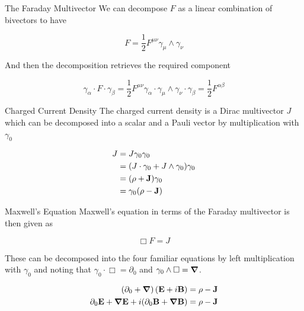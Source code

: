 \documentclass{beamer}
\begin{document}
\begin{frame}{The Faraday Multivector}
We can decompose $F$ as a linear combination of bivectors to have

\begin{equation*}
	F = \frac{1}2 F^{\mu\nu} \gamma_\mu \wedge \gamma_\nu
\end{equation*}

And then the decomposition retrieves the required component

\begin{equation*}
	\gamma_\alpha \cdot F \cdot \gamma_\beta  = \frac{1}{2} F^{\mu\nu} \gamma_\alpha \cdot \gamma_\mu \wedge \gamma_\nu \cdot \gamma_\beta = \frac{1}{2} F^{\alpha\beta}
\end{equation*}
\end{frame}

\begin{frame}{Charged Current Density}
The charged current density is a Dirac multivector $J$ which can be decomposed into a scalar and a Pauli vector by multiplication with $\gamma_0$

\begin{align*}
	J &= J\gamma_0\gamma_0 \\
	&= (J\cdot\gamma_0 + J \wedge \gamma_0) \gamma_0 \\
	&= (\rho + \vb J) \gamma_0 \\
	&= \gamma_0 (\rho - \vb J)
\end{align*}
\end{frame}

\begin{frame}{Maxwell's Equation}
Maxwell's equation in terms of the Faraday multivector is then given as

\begin{equation}
	\Box F = J
\end{equation}

These can be decomposed into the four familiar equations by left multiplication with $\gamma_0$ and noting that $\gamma_0 \cdot \Box = \partial_0$ and $\gamma_0 \wedge \Box = \grad$.

\begin{align*}
	\left(\partial_0 + \grad\right) (\vb E + i\vb B) &= \rho - \vb J \\
	\partial_0 \vb E + \grad \vb E + i(\partial_0 \vb B + \grad \vb B) &= \rho - \vb J
\end{align*}
\end{frame}
\end{document}
